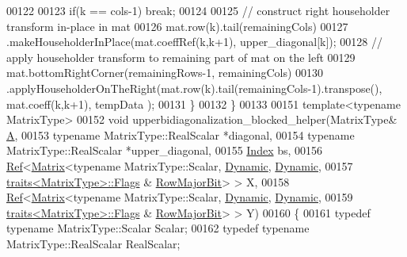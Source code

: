 \begin{DoxyCode}
00122 
00123     \textcolor{keywordflow}{if}(k == cols-1) \textcolor{keywordflow}{break};
00124 
00125     \textcolor{comment}{// construct right householder transform in-place in mat}
00126     mat.row(k).tail(remainingCols)
00127        .makeHouseholderInPlace(mat.coeffRef(k,k+1), upper\_diagonal[k]);
00128     \textcolor{comment}{// apply householder transform to remaining part of mat on the left}
00129     mat.bottomRightCorner(remainingRows-1, remainingCols)
00130        .applyHouseholderOnTheRight(mat.row(k).tail(remainingCols-1).transpose(), mat.coeff(k,k+1), tempData
      );
00131   \}
00132 \}
00133 
00151 \textcolor{keyword}{template}<\textcolor{keyword}{typename} MatrixType>
00152 \textcolor{keywordtype}{void} upperbidiagonalization\_blocked\_helper(MatrixType& \hyperlink{group___core___module_class_eigen_1_1_matrix}{A},
00153                                            \textcolor{keyword}{typename} MatrixType::RealScalar *diagonal,
00154                                            \textcolor{keyword}{typename} MatrixType::RealScalar *upper\_diagonal,
00155                                            \hyperlink{class_eigen_1_1internal_1_1_upper_bidiagonalization_adcb14f3919a3dcc9977ba6b8105087fe}{Index} bs,
00156                                            \hyperlink{group___core___module_class_eigen_1_1_ref}{Ref}<\hyperlink{group___core___module_class_eigen_1_1_matrix}{Matrix}<\textcolor{keyword}{typename} MatrixType::Scalar, 
      \hyperlink{namespace_eigen_ad81fa7195215a0ce30017dfac309f0b2}{Dynamic}, \hyperlink{namespace_eigen_ad81fa7195215a0ce30017dfac309f0b2}{Dynamic},
00157                                                       \hyperlink{struct_eigen_1_1internal_1_1traits}{traits<MatrixType>::Flags} & 
      \hyperlink{group__flags_gae4f56c2a60bbe4bd2e44c5b19cbe8762}{RowMajorBit}> > X,
00158                                            \hyperlink{group___core___module_class_eigen_1_1_ref}{Ref}<\hyperlink{group___core___module_class_eigen_1_1_matrix}{Matrix}<\textcolor{keyword}{typename} MatrixType::Scalar, 
      \hyperlink{namespace_eigen_ad81fa7195215a0ce30017dfac309f0b2}{Dynamic}, \hyperlink{namespace_eigen_ad81fa7195215a0ce30017dfac309f0b2}{Dynamic},
00159                                                       \hyperlink{struct_eigen_1_1internal_1_1traits}{traits<MatrixType>::Flags} & 
      \hyperlink{group__flags_gae4f56c2a60bbe4bd2e44c5b19cbe8762}{RowMajorBit}> > Y)
00160 \{
00161   \textcolor{keyword}{typedef} \textcolor{keyword}{typename} MatrixType::Scalar Scalar;
00162   \textcolor{keyword}{typedef} \textcolor{keyword}{typename} MatrixType::RealScalar RealScalar;

\end{DoxyCode}
